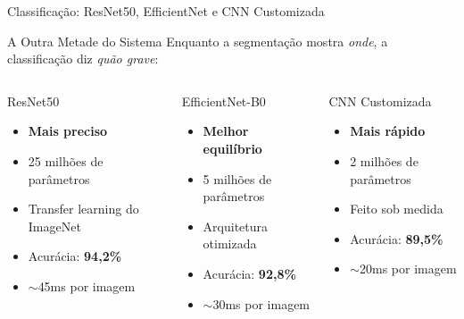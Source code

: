 \documentclass[aspectratio=169, 12pt]{beamer}
\begin{document}
\begin{frame}{Classificação: ResNet50, EfficientNet e CNN Customizada}
    \begin{block}{A Outra Metade do Sistema}
        Enquanto a segmentação mostra \textit{onde}, a classificação diz \textit{quão grave}:
    \end{block}

    \vspace{0.2cm}

    \begin{columns}[T]
        \begin{block}{\footnotesize ResNet50}
            \begin{itemize}
                \item[\faAward] \textbf{Mais preciso}
                \item 25 milhões de parâmetros
                \item Transfer learning do ImageNet
                \item Acurácia: \textbf{94,2\%}
                \item $\sim$45ms por imagem
            \end{itemize}
        \end{block}

        \begin{block}{\footnotesize EfficientNet-B0}
            \begin{itemize}
                \item[\faBalanceScale] \textbf{Melhor equilíbrio}
                \item 5 milhões de parâmetros
                \item Arquitetura otimizada
                \item Acurácia: \textbf{92,8\%}
                \item $\sim$30ms por imagem
            \end{itemize}
        \end{block}

        \begin{block}{\footnotesize CNN Customizada}
            \begin{itemize}
                \item[\faBolt] \textbf{Mais rápido}
                \item 2 milhões de parâmetros
                \item Feito sob medida
                \item Acurácia: \textbf{89,5\%}
                \item $\sim$20ms por imagem
            \end{itemize}
        \end{block}
    \end{columns}


\end{frame}
\end{document}
